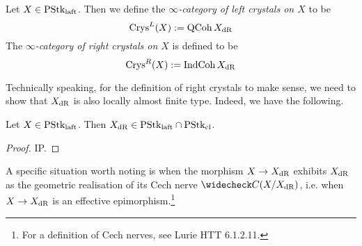 \documentclass[./main.tex]{subfiles}
\begin{document}
\begin{dfn}
  
  Let $X \in \mathrm{PStk}_{\mathrm{laft}}$.
  Then we define the \emph{$\infty$-category of left crystals on $X$} to be
  \[
    \mathrm{Crys}^L(X) := \mathrm{QCoh}\,X_{\mathrm{dR}}  
  \]
  The \emph{$\infty$-category of right crystals on $X$} is defined to be
  \[
    \mathrm{Crys}^R(X) := \mathrm{IndCoh}\,X_{\mathrm{dR}}  
  \]

\end{dfn}

Technically speaking, for the definition of right crystals to make sense,
we need to show that $X_{\mathrm{dR}}$ is also locally almost finite type.
Indeed, we have the following.

\begin{prop}

  Let $X \in \mathrm{PStk}_{\mathrm{laft}}$.
  Then $X_{\mathrm{dR}} \in \mathrm{PStk}_{\mathrm{laft}} \cap \mathrm{PStk}_{\mathrm{cl}}$.
\end{prop}
\begin{proof}
  IP.
\end{proof}

\begin{rmk}
  
  A specific situation worth noting is when 
  the morphism $X \to X_{\mathrm{dR}}$ exhibits $X_{\mathrm{dR}}$ as the 
  geometric realisation of its Cech nerve $\check{C}(X/X_\DR)$,
  i.e. when $X \to X_{\mathrm{dR}}$ is an effective epimorphism.\footnote{
    For a definition of Cech nerves,
    see Lurie HTT 6.1.2.11. 
  }
\end{rmk}
\end{document}
